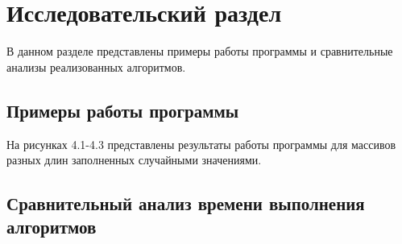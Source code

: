 \chapter{Исследовательский раздел}
В данном разделе представлены примеры работы программы и сравнительные анализы реализованных алгоритмов.

\section{Примеры работы программы}
На рисунках 4.1-4.3 представлены результаты работы программы для массивов разных длин заполненных случайными значениями.




\section{Сравнительный анализ времени выполнения алгоритмов}
